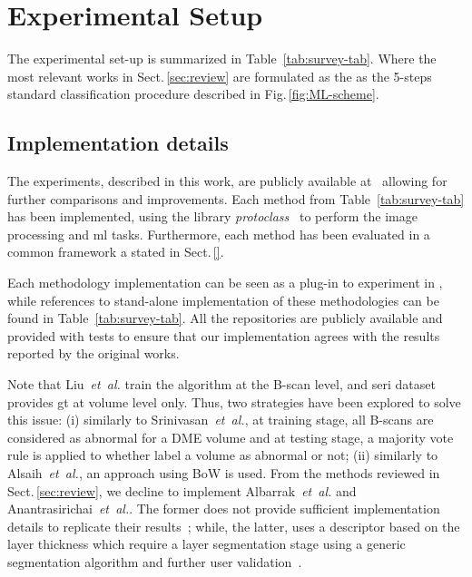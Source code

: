 \graphicspath{ {./content/method/figures/} }

\section{Experimental Setup}\label{sec:exp}

The experimental set-up is summarized in Table~\ref{tab:survey-tab}.
Where the most relevant works in Sect.\,\ref{sec:review} are formulated as the as the 5-steps standard classification procedure described in Fig.\,\ref{fig:ML-scheme}.



\subsection{Implementation details}\label{sec:exp:implementation}
The experiments, described in this work, are publicly available at~\cite{rethinopaty20016apr-repoICPR} allowing for further comparisons and improvements.
Each method from Table~\ref{tab:survey-tab} has been implemented, using the library \emph{protoclass}~\cite{protoclass2016apr-repoICPR} to perform the image processing and \gls{ml} tasks.
Furthermore, each method has been evaluated in a common framework a stated in Sect.\,\ref{}.

{\color{red}Each methodology implementation can be seen as a plug-in to experiment in \cite{rethinopaty20016apr-repoICPR}, while references to stand-alone implementation of these methodologies can be found in Table~\ref{tab:survey-tab}.
All the repositories are publicly available and provided with tests to ensure that our implementation agrees with the results reported by the original works.}

Note that Liu~\emph{et~al.} train the algorithm at the B-scan level, and \gls{seri} dataset provides \gls{gt} at volume level only.
Thus, two strategies have been explored to solve this issue:
(i) similarly to Srinivasan~\emph{et~al.}, at training stage, all B-scans are considered as abnormal for a DME volume and at testing stage, a majority vote rule is applied to whether label a volume as abnormal or not;
(ii) similarly to Alsaih~\emph{et~al.}, an approach using BoW is used.
From the methods reviewed in Sect.\,\ref{sec:review}, we decline to implement Albarrak~\emph{et~al.} and Anantrasirichai~\textit{et~al.}.
The former does not provide sufficient implementation details to replicate their results~\cite{albarrak2013age};
while, the latter, uses a descriptor based on the layer thickness which require a layer segmentation stage using a generic segmentation algorithm and further user validation~\cite{anantrasirichai2013svm}.


